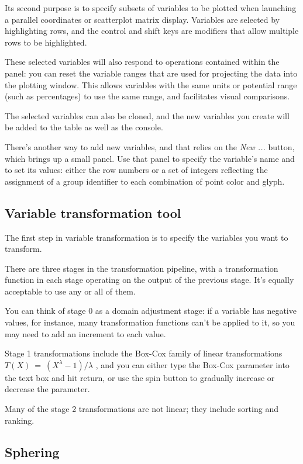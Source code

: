 \documentclass[11pt]{article}
\begin{document}
Its second purpose is to specify subsets of variables to be plotted
when launching a parallel coordinates or scatterplot matrix display.
Variables are selected by highlighting rows, and the control and shift
keys are modifiers that allow multiple rows to be highlighted.

These selected variables will also respond to operations contained
within the panel:  you can reset the variable ranges that are used
for projecting the data into the plotting window.  This allows
variables with the same units or potential range (such as percentages)
to use the same range, and facilitates visual comparisons.

The selected variables can also be cloned, and the new variables
you create will be added to the table as well as the console.

\label{NewVariable}
There's another way to add new variables, and that relies on the {\em New
...} button, which brings up a small panel.  Use that panel to specify
the variable's name and to set its values:  either the row numbers or
a set of integers reflecting the assignment of a group identifier to each
combination of point color and glyph.

\subsection{Variable transformation tool}
\label{slbl:VarTransform}

The first step in variable transformation is to specify the variables
you want to transform.

There are three stages in the transformation pipeline, with a
transformation function in each stage operating on the output of the
previous stage.  It's equally acceptable to use any or all of them.

You can think of stage 0 as a domain adjustment stage:  if a variable
has negative values, for instance, many transformation functions
can't be applied to it, so you may need to add an increment to each
value.

Stage 1 transformations include the Box-Cox family of linear
transformations \( T(X)~=~(X ^ \lambda - 1) / \lambda\) \cite{BoxCox64},
and you can either type the Box-Cox parameter into
the text box and hit return, or use the spin button to gradually
increase or decrease the parameter. 

Many of the stage 2
transformations are not linear; they include sorting and ranking.

\subsection{Sphering}
\label{slbl:Sphering}
\end{document}
